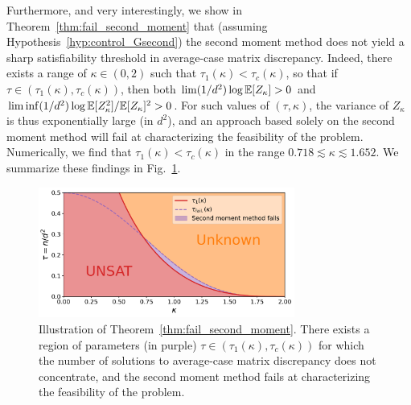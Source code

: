 \myskip
Furthermore, and very interestingly, we show in Theorem~\ref{thm:fail_second_moment} that 
(assuming Hypothesis~\ref{hyp:control_Gsecond}) the second moment method does not yield a sharp satisfiability threshold in average-case matrix discrepancy. 
Indeed, there exists a range of $\kappa \in (0,2)$ such that 
$\tau_1(\kappa) < \tau_{c}(\kappa)$, so that if $\tau \in (\tau_1(\kappa), \tau_c(\kappa))$, 
then both $\lim (1/d^2) \log \mathbb{E}[Z_\kappa] > 0$ and $\liminf (1/d^2) \log \mathbb{E}[Z_\kappa^2]/\mathbb{E}[Z_\kappa]^2 > 0$.
For such values of $(\tau, \kappa)$, the variance of $Z_\kappa$ is thus exponentially large (in $d^2$), and an approach based solely on the second moment method 
will fail at characterizing the feasibility of the problem.
Numerically, we find  that $\tau_1(\kappa) < \tau_c(\kappa)$ in the range $0.718 \lesssim \kappa \lesssim 1.652$. We summarize these findings in Fig.~\ref{fig:fail_second_moment}.
\begin{figure}[!t]
    \centering
    \includegraphics[width=0.75\textwidth]{figures/fail_second_moment.pdf}
    \caption{
        Illustration of Theorem~\ref{thm:fail_second_moment}. There exists a region of parameters (in purple) $\tau \in (\tau_1(\kappa), \tau_c(\kappa))$
        for which the number of solutions to average-case matrix discrepancy does not concentrate, and the second moment method fails at characterizing the feasibility of the problem.
    \label{fig:fail_second_moment}}
\end{figure}

